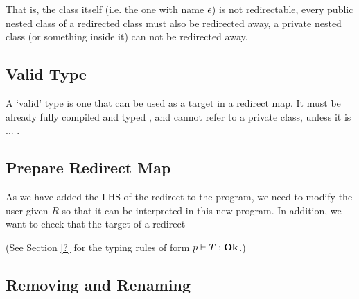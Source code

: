 \begin{defs}
\end{defs}
That is, the class itself (i.e. the one with name $\epsilon$) is not redirectable, every public nested class of a redirected class must also be redirected away, a private nested class (or something inside it) can not be redirected away.

\subsection{Valid Type}
A `valid' type is one that can be used as a target in a redirect map. It must be already fully compiled and typed , and cannot refer to a private class, unless it is ... .
\subsection{Prepare Redirect Map}
As we have added the LHS of the redirect to the program, we need to modify the user-given $R$ so that it can be interpreted in this new program. In addition, we want to check that the target of a redirect 

\begin{defs}
\end{defs}
(See Section \ref{?} for the typing rules of form $p \vdash T : \textbf{Ok}$.)

\subsection{Removing and Renaming}

